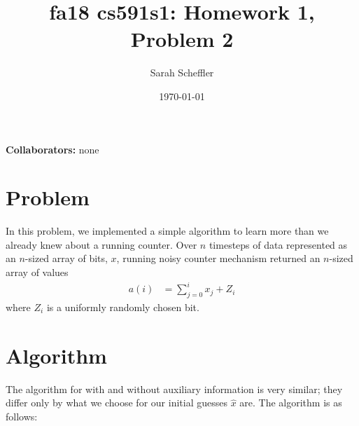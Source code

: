 \documentclass{article}
\title{fa18 cs591s1: Homework 1, Problem 2}
\author{Sarah Scheffler}
\date{\today}
\begin{document}
\maketitle
\textbf{Collaborators: } none

\section{Problem}

In this problem, we implemented a simple algorithm to learn more than we already knew about a running counter.  
Over $n$ timesteps of data represented as an $n$-sized array of bits, $x$, running noisy counter mechanism
returned an $n$-sized array of values
\begin{align*}
    a(i) &= \sum_{j=0}^i x_j + Z_i
\end{align*}
where $Z_i$ is a uniformly randomly chosen bit.

\section{Algorithm}

The algorithm for with and without auxiliary information is very similar; they differ only by what we choose
for our initial guesses $\hat{x}$ are.  The algorithm is as follows:
\end{document}

